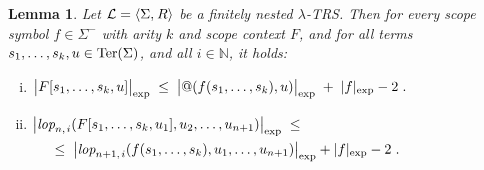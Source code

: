 \documentclass[
submission
]{dmtcs-episciences-tampered}
\makeatletter
\newcommand{\fap}[2]{#1({#2})}
\newcommand{\bfap}[3]{{#1}({#2},\hspace*{0.05pt}{#3})}
\newcommand{\indap}[2]{#1 _{#2}}
\newcommand{\supap}[2]{#1 ^{#2}}
\newcommand{\pap}{\supap}
\newcommand{\nb}{\nobreakdash}
\newcommand{\nf}{\normalfont}
\newcommand{\punc}[1]{\ensuremath{\hspace*{3pt}{#1}}}
\newcommand{\tuple}[1]{\langle #1 \rangle}
\newcommand{\tuplespace}{\hspace*{0.5pt}}
\newcommand{\pair}[2]{\tuple{#1, \tuplespace #2}}
\newcommand{\nat}{\mathbb{N}}
\newcommand{\ater}{s}
\newcommand{\cter}{u}
\newcommand{\ateri}{\indap{\ater}}
\newcommand{\cteri}{\indap{\cter}}
\newcommand{\asig}{\Sigma}
\newcommand{\asigmin}{\supap{\asig}{-}}
\newcommand{\arules}{R}
\newcommand{\alTRS}{{\cal L}}
\newcommand{\TRS}{TRS}
\newcommand{\stermsover}{\text{\nf Ter}}
\newcommand{\termsover}{\fap{\stermsover}}
\newcommand{\sfolapp}{@}
\newcommand{\folapp}{\bfap{\sfolapp}}
\newcommand{\afoscopesym}{f}
\newcommand{\afoscope}{\fap{\afoscopesym}}
\newcommand{\cxtap}[2]{{#1}[#2]}
\newcommand{\afoscopecxt}{F}
\newcommand{\afoscopecxtap}{\cxtap{\afoscopecxt}}
\newcommand{\expdepth}[1]{\lvert{#1}\rvert_{\scriptexp}}
\newcommand{\expdepthbig}[1]{\bigl\lvert{#1}\bigr\rvert_{\scriptexp}}
\newcommand{\slop}{\textit{lop}}\newcommand{\slopstar}{\pap{\slop}{*}}
\newcommand{\slopni}[2]{\slop_{#1,\hspace*{1pt}#2}}
\newcommand{\lopni}[2]{\fap{\slopni{#1}{#2}}}
\newcommand{\scriptexp}{\text{\nf exp}}
\newcommand{\lTRS}{$\lambda$\hspace*{-0.5pt}\nb-\hspace*{-0.5pt}\TRS}
\theoremstyle{plain}
\newtheorem{lemma}[theorem]{Lemma}
\theoremstyle{definition}
\makeatother
\begin{document}
\begin{lemma}\label{lem:depth-increase:contract-step}
  Let $\alTRS = \pair{\asig}{\arules}$ be a finitely nested \lTRS.
  Then for every scope symbol $\afoscopesym\in\asigmin$ with arity $k$ and scope context $\afoscopecxt$,
  and for all terms $\ateri{1},\ldots,\ateri{k},\cter\in\termsover{\asig}$, and all $i\in\nat$, it holds:
  \begin{enumerate}[(i)]\setlength{\itemsep}{0ex}
    \item{}\label{it:1:lem:depth-increase:contract-step}
      $
      \expdepthbig{\afoscopecxtap{\ateri{1},\ldots,\ateri{k},\cter}}
        \;\le\;
      \expdepthbig{\folapp{\afoscope{\ateri{1},\ldots,\ateri{k}}}{\cter}}
        \;+\;
      \expdepth{\afoscopesym} - 2 \punc{.}
      $
    \item{}\label{it:2:lem:depth-increase:contract-step}
      $
      \begin{aligned}[t]
        &   
        \expdepthbig{ \lopni{n}{i}{\afoscopecxtap{\ateri{1},\ldots,\ateri{k},\cteri{1}},\cteri{2},\ldots,\cteri{n+1}} } 
          \; \le  
        \\
        & \hspace*{3ex}
        \le\;  
        \expdepthbig{ \lopni{n+1}{i}{\afoscope{\ateri{1},\ldots,\ateri{k}},\cteri{1},\ldots,\cteri{n+1}} }
          +
        \expdepth{\afoscopesym} - 2 \punc{.}
      \end{aligned}   
      $
  \end{enumerate}
\end{lemma}
\end{document}
